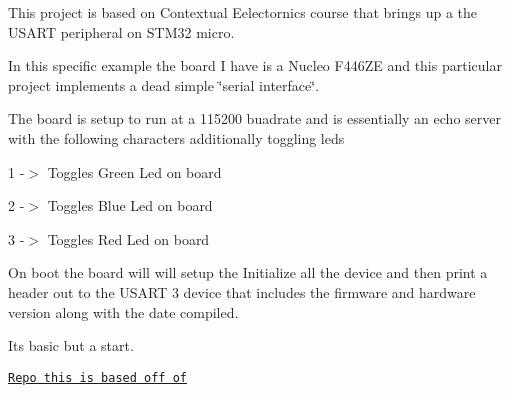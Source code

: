 This project is based on Contextual Eelectornics course that brings up a the U\+S\+A\+RT peripheral on S\+T\+M32 micro.

In this specific example the board I have is a Nucleo F446\+ZE and this particular project implements a dead simple \char`\"{}serial interface\char`\"{}.

The board is setup to run at a 115200 buadrate and is essentially an echo server with the following characters additionally toggling leds


\begin{DoxyItemize}
\item 1 -\/$>$ Toggles Green Led on board
\item 2 -\/$>$ Toggles Blue Led on board
\item 3 -\/$>$ Toggles Red Led on board
\end{DoxyItemize}

On boot the board will will setup the Initialize all the device and then print a header out to the U\+S\+A\+RT 3 device that includes the firmware and hardware version along with the date compiled.

It\textquotesingle{}s basic but a start.

\href{https://github.com/ContextualElectronics/Embedded/tree/master/USART/Lesson_2}{\tt Repo this is based off of} 